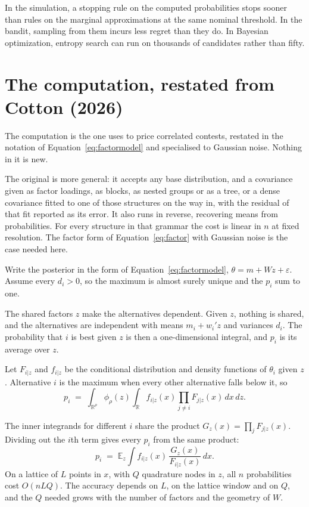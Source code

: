 \documentclass[11pt]{article}
\begin{document}
In the simulation, a stopping rule on the computed probabilities stops sooner than rules on the marginal approximations at the same nominal threshold. In the bandit, sampling from them incurs less regret than they do. In
Bayesian optimization, entropy search can run on thousands of
candidates rather than fifty.

\section{The computation, restated from Cotton (2026)}
\label{sec:computation}

The computation is the one \citet{cotton2026} uses to price correlated contests, restated in the notation of
Equation~\eqref{eq:factormodel} and specialised to Gaussian noise.
Nothing in it is new.

The original is more general: it accepts any
base distribution, and a covariance given as factor loadings, as
blocks, as nested groups or as a tree, or a dense covariance fitted to one of those structures on the way
in, with the residual of that fit reported as its error. It also runs in reverse, recovering means from probabilities. For every
structure in that grammar the cost is linear in $n$ at fixed
resolution. The factor form of
Equation~\eqref{eq:factor} with Gaussian noise is the case needed
here.

Write the posterior in the form of Equation~\eqref{eq:factormodel},
$\theta = m + W z + \varepsilon$. Assume every $d_i > 0$, so the
maximum is almost surely unique and the $p_i$ sum to one.

The shared factors $z$ make the alternatives dependent. Given $z$,
nothing is shared, and the alternatives are independent with means
$m_i + w_i' z$ and variances $d_i$. The probability that $i$ is
best given $z$ is then a one-dimensional integral, and $p_i$ is its
average over $z$.

Let $F_{i|z}$ and $f_{i|z}$ be the conditional distribution and
density functions of $\theta_i$ given $z$. Alternative $i$ is the
maximum when every other alternative falls below it, so
\begin{equation}
p_i \;=\; \int_{\mathbb{R}^\rho} \phi_\rho(z) \int_{\mathbb{R}}
f_{i|z}(x) \prod_{j \neq i} F_{j|z}(x)\, dx \, dz .
\label{eq:integral}
\end{equation}

The inner integrands for different $i$ share the product
$G_z(x) = \prod_j F_{j|z}(x)$. Dividing out the $i$th term gives
every $p_i$ from the same product:
\begin{equation}
p_i \;=\; \mathbb{E}_z \int f_{i|z}(x)\,
\frac{G_z(x)}{F_{i|z}(x)} \, dx .
\label{eq:cavity}
\end{equation}
On a lattice of $L$ points in $x$, with $Q$ quadrature nodes in $z$,
all $n$ probabilities cost $O(nLQ)$. The accuracy depends on $L$, on the
lattice window and on $Q$, and the $Q$ needed grows with the number of
factors and the geometry of $W$.
\end{document}

